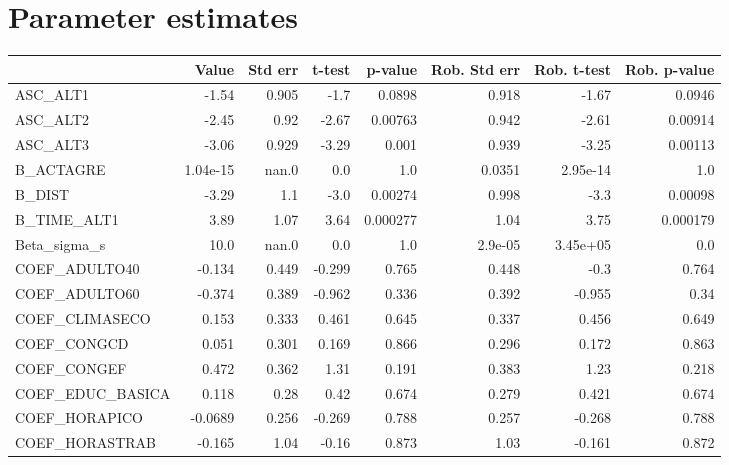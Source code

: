 \section{Parameter estimates}
\begin{tabular}{lrrrrrrr}
\toprule
{} &    Value &  Std err &  t-test &  p-value &  Rob. Std err &  Rob. t-test &  Rob. p-value \\
\midrule
ASC\_ALT1         &    -1.54 &    0.905 &    -1.7 &   0.0898 &         0.918 &        -1.67 &        0.0946 \\
ASC\_ALT2         &    -2.45 &     0.92 &   -2.67 &  0.00763 &         0.942 &        -2.61 &       0.00914 \\
ASC\_ALT3         &    -3.06 &    0.929 &   -3.29 &    0.001 &         0.939 &        -3.25 &       0.00113 \\
B\_ACTAGRE        & 1.04e-15 &    nan.0 &     0.0 &      1.0 &        0.0351 &     2.95e-14 &           1.0 \\
B\_DIST           &    -3.29 &      1.1 &    -3.0 &  0.00274 &         0.998 &         -3.3 &       0.00098 \\
B\_TIME\_ALT1      &     3.89 &     1.07 &    3.64 & 0.000277 &          1.04 &         3.75 &      0.000179 \\
Beta\_sigma\_s     &     10.0 &    nan.0 &     0.0 &      1.0 &       2.9e-05 &     3.45e+05 &           0.0 \\
COEF\_ADULTO40    &   -0.134 &    0.449 &  -0.299 &    0.765 &         0.448 &         -0.3 &         0.764 \\
COEF\_ADULTO60    &   -0.374 &    0.389 &  -0.962 &    0.336 &         0.392 &       -0.955 &          0.34 \\
COEF\_CLIMASECO   &    0.153 &    0.333 &   0.461 &    0.645 &         0.337 &        0.456 &         0.649 \\
COEF\_CONGCD      &    0.051 &    0.301 &   0.169 &    0.866 &         0.296 &        0.172 &         0.863 \\
COEF\_CONGEF      &    0.472 &    0.362 &    1.31 &    0.191 &         0.383 &         1.23 &         0.218 \\
COEF\_EDUC\_BASICA &    0.118 &     0.28 &    0.42 &    0.674 &         0.279 &        0.421 &         0.674 \\
COEF\_HORAPICO    &  -0.0689 &    0.256 &  -0.269 &    0.788 &         0.257 &       -0.268 &         0.788 \\
COEF\_HORASTRAB   &   -0.165 &     1.04 &   -0.16 &    0.873 &          1.03 &       -0.161 &         0.872 \\

\end{tabular}

